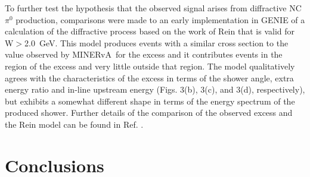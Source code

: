 \documentclass[%
preprint,
 amsmath,amssymb,
 aps,
]{revtex4-1}
\newcommand{\minerva}{\mbox{MINERvA}}
\begin{document}
To further test the hypothesis that the observed signal arises from diffractive NC $\pi^{0}$ production, comparisons were made to an early implementation in GENIE of a calculation of the diffractive process based on the work of Rein \cite{Rein1986} that is valid for W$>$2.0~GeV.  
This model produces events with a similar cross section to the value observed by \minerva\ for the excess and it contributes events in the region of the excess and very little outside that region.  The model qualitatively agrees with the characteristics of the excess in terms of the shower angle, extra energy ratio and in-line upstream energy (Figs. 3(b), 3(c), and 3(d), respectively), but exhibits a somewhat different shape in terms of the energy spectrum of the produced shower.
Further details of the comparison of the observed excess and the Rein model can be found in Ref. \cite{JWthesis}.  

 
\section{\label{concl}Conclusions}
\end{document}
